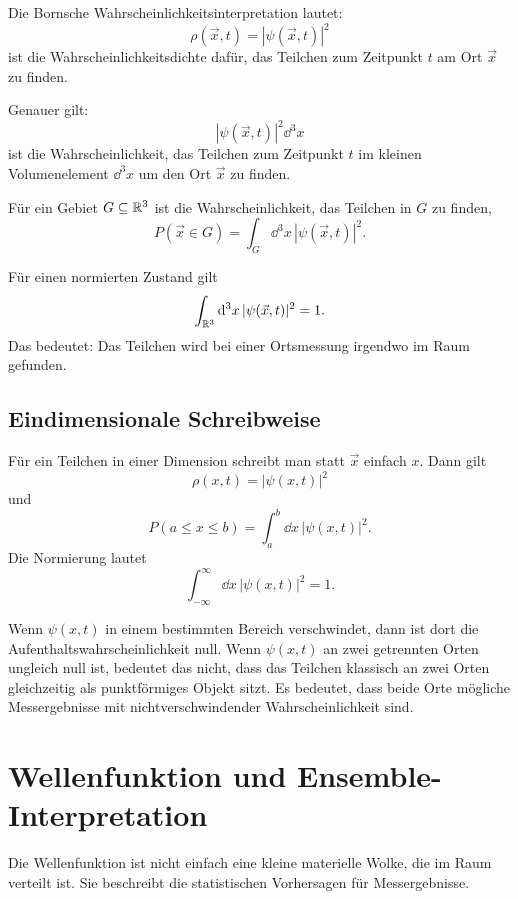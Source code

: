 \begin{definitionbox}
Die Bornsche Wahrscheinlichkeitsinterpretation lautet:
\[
    \rho(\vec{x},t)=|\psi(\vec{x},t)|^2
\]
ist die Wahrscheinlichkeitsdichte dafür, das Teilchen zum Zeitpunkt $t$ am Ort $\vec{x}$ zu finden.
\end{definitionbox}

Genauer gilt:
\[
    |\psi(\vec{x},t)|^2\dd^3x
\]
ist die Wahrscheinlichkeit, das Teilchen zum Zeitpunkt $t$ im kleinen Volumenelement $\dd^3x$ um den Ort $\vec{x}$ zu finden.

Für ein Gebiet $G\subseteq\mathbb{R}^3$ ist die Wahrscheinlichkeit, das Teilchen in $G$ zu finden,
\[
    P(\vec{x}\in G)=\int_G\dd^3x\,|\psi(\vec{x},t)|^2.
\]

\begin{formulabox}
Für einen normierten Zustand gilt
\[
    \int_{\mathbb{R}^3}\mathrm{d}^3x\,|\psi(\vec{x},t)|^2=1.
\]
Das bedeutet: Das Teilchen wird bei einer Ortsmessung irgendwo im Raum gefunden.
\end{formulabox}

\subsection{Eindimensionale Schreibweise}

Für ein Teilchen in einer Dimension schreibt man statt $\vec{x}$ einfach $x$. Dann gilt
\[
    \rho(x,t)=|\psi(x,t)|^2
\]
und
\[
    P(a\le x\le b)=\int_a^b\dd x\,|\psi(x,t)|^2.
\]
Die Normierung lautet
\[
    \int_{-\infty}^{\infty}\dd x\,|\psi(x,t)|^2=1.
\]

\begin{examplebox}
Wenn $\psi(x,t)$ in einem bestimmten Bereich verschwindet, dann ist dort die Aufenthaltswahrscheinlichkeit null. Wenn $\psi(x,t)$ an zwei getrennten Orten ungleich null ist, bedeutet das nicht, dass das Teilchen klassisch an zwei Orten gleichzeitig als punktförmiges Objekt sitzt. Es bedeutet, dass beide Orte mögliche Messergebnisse mit nichtverschwindender Wahrscheinlichkeit sind.
\end{examplebox}

\section{Wellenfunktion und Ensemble-Interpretation}

Die Wellenfunktion ist nicht einfach eine kleine materielle Wolke, die im Raum verteilt ist. Sie beschreibt die statistischen Vorhersagen für Messergebnisse.

